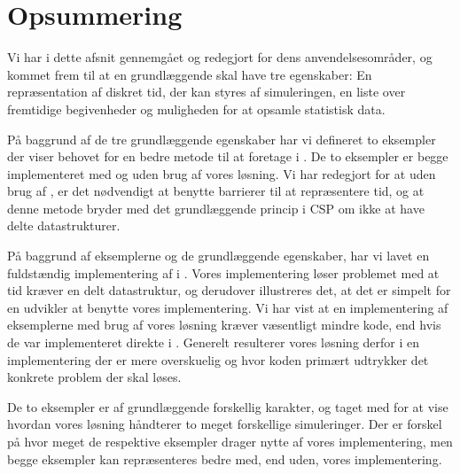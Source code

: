 \section{Opsummering}
Vi har i dette afsnit gennemgået \des og redegjort for dens anvendelsesområder, og kommet frem til at en \des grundlæggende skal have tre egenskaber: En repræsentation af diskret tid, der kan styres af simuleringen, en liste over fremtidige begivenheder og muligheden for at opsamle statistisk data. 

På baggrund af de tre grundlæggende egenskaber har vi defineret to eksempler der viser behovet for en bedre metode til at foretage \des i \pycsp. 
De to eksempler er begge implementeret med og uden brug af vores \des løsning. Vi har redegjort for at uden brug af \des, er det nødvendigt at benytte barrierer til at repræsentere tid, og at denne metode bryder med det grundlæggende princip i CSP om ikke at have delte datastrukturer. 

På baggrund af eksemplerne og de grundlæggende egenskaber, har vi lavet en fuldstændig implementering af \des i \pycsp.
Vores implementering løser problemet med at tid kræver en delt datastruktur, og derudover illustreres det, at det er simpelt for en udvikler at benytte vores implementering. 
 Vi har vist  at en implementering af eksemplerne med brug af vores løsning kræver væsentligt mindre kode, end hvis de var implementeret direkte i \pycsp. Generelt resulterer vores løsning derfor i en implementering der er mere overskuelig og hvor koden primært udtrykker det konkrete problem der skal løses. 

De to eksempler er af grundlæggende forskellig karakter, og taget med for at vise hvordan vores løsning håndterer to meget forskellige simuleringer. Der er forskel på hvor meget de respektive eksempler drager nytte af vores implementering, men begge eksempler kan repræsenteres bedre med, end uden, vores implementering. 

